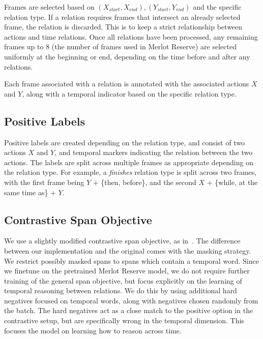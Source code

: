 Frames are selected based on $(X_{start}, X_{end}), (Y_{start}, Y_{end})$ and
the specific relation type. If a relation requires frames that intersect an
already selected frame, the relation is discarded. This is to keep a strict
relationship between actions and time relations. Once all relations have been
processed, any remaining frames up to 8 (the number of frames used in Merlot
Reserve) are selected uniformly at the beginning or end, depending on the time
before and after any relations. %

Each frame associated with a relation is annotated with the associated actions
$X$ and $Y$, along with a temporal indicator based on the specific relation
type. 


\subsection{Positive Labels}

Positive labels are created depending on the relation type, and consist of two
actions $X$ and $Y$, and temporal markers indicating the relation between the
two actions. The labels are split across multiple frames as appropriate
depending on the relation type. For example, a \textit{finishes} relation type
is split across two frames, with the first frame being $Y$ + \{then, before\},
and the second $X$ + \{while, at the same time as\} + $Y$. 

\subsection{Contrastive Span Objective}

We use a slightly modified contrastive span objective, as
in~\cite{zellers2022mreserve}. The difference between our implementation and
the original comes with the masking strategy. We restrict possibly masked spans
to spans which contain a temporal word. Since we finetune on the pretrained
Merlot Reserve model, we do not require further training of the general span
objective, but focus explicitly on the learning of temporal reasoning between
relations. We do this by using additional hard negatives focused on temporal
words, along with negatives chosen randomly from the batch.  The hard negatives
act as a close match to the positive option in the contrastive setup, but are
specifically wrong in the temporal dimension. This focuses the model on learning
how to reason across time.

